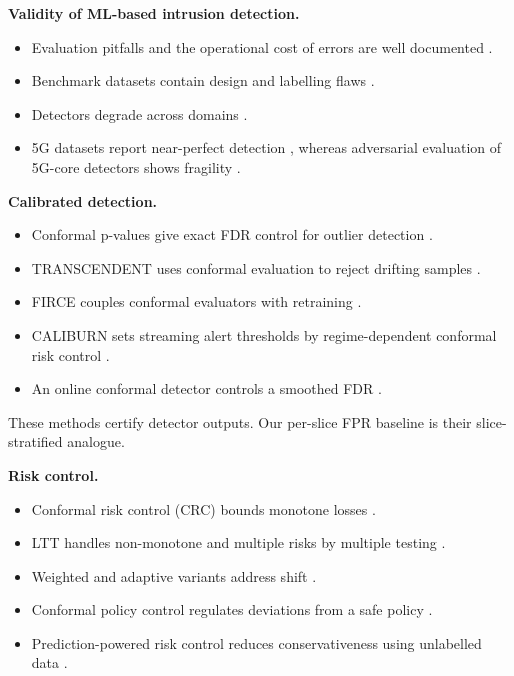 \textbf{Validity of ML-based intrusion detection.}

\begin{itemize}
\tightlist
\item
  Evaluation pitfalls and the operational cost of errors are well
  documented \cite{sommer2010outside, arp2022dos}.
\item
  Benchmark datasets contain design and labelling flaws
  \cite{engelen2021troubleshooting, flood2024smells}.
\item
  Detectors degrade across domains \cite{layeghy2023xcross}.
\item
  5G datasets report near-perfect detection
  \cite{siriwardhana2025nidd, khan2023slicesecure, amponis2022pfcp},
  whereas adversarial evaluation of 5G-core detectors shows fragility
  \cite{manca2026sage5gc}.
\end{itemize}

\textbf{Calibrated detection.}

\begin{itemize}
\tightlist
\item
  Conformal p-values give exact FDR control for outlier detection
  \cite{bates2023outliers}.
\item
  TRANSCENDENT uses conformal evaluation to reject drifting samples
  \cite{barbero2022transcendent}.
\item
  FIRCE couples conformal evaluators with retraining
  \cite{barrett2026firce}.
\item
  CALIBURN sets streaming alert thresholds by regime-dependent conformal
  risk control \cite{youssef2026caliburn}.
\item
  An online conformal detector controls a smoothed FDR
  \cite{farzaneh2025ccoad}.
\end{itemize}

These methods certify detector outputs. Our per-slice FPR baseline is
their slice-stratified analogue.

\textbf{Risk control.}

\begin{itemize}
\tightlist
\item
  Conformal risk control (CRC) bounds monotone losses
  \cite{angelopoulos2024crc}.
\item
  LTT handles non-monotone and multiple risks by multiple testing
  \cite{angelopoulos2025ltt}.
\item
  Weighted and adaptive variants address shift
  \cite{tibshirani2019weighted, barber2023beyond, gibbs2021aci}.
\item
  Conformal policy control regulates deviations from a safe policy
  \cite{prinster2026cpc}.
\item
  Prediction-powered risk control reduces conservativeness using
  unlabelled data \cite{einbinder2025ssrc}.
\end{itemize}

